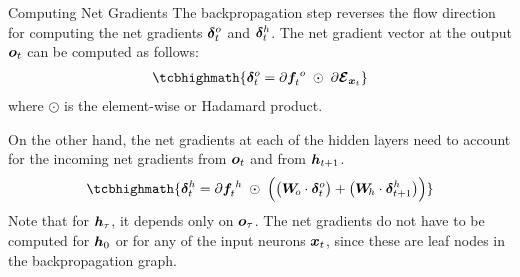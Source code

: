 %
%
\begin{frame}{Computing Net Gradients}
The backpropagation step reverses
the flow direction for computing the net gradients ${\bm \delta}^o_t$ and
${\bm \delta}^h_t$.%
%
The net gradient vector at the output ${\boldsymbol o}_t$ can be
computed as follows:
\begin{align*}
    \tcbhighmath{
\bdelta^o_t = \partial\bff^{\;o}_t \;\odot\; \partial\bcE_{\bx_t}}
\end{align*}
where $\odot$ is the element-wise or Hadamard product.

On the other hand, the net gradients at each of the hidden layers
need to account for the incoming net gradients from ${\boldsymbol o}_t$ and from
${\boldsymbol h}_{t+1}$.%
\begin{align*}
    \tcbhighmath{
    \bdelta^h_t = \partial\bff^{\;h}_t \;\odot\; 
    \Bigl( \bigl(\bW_{\!o} \cdot \bdelta^o_t \bigr) + 
        \bigl(\bW_{\!h} \cdot \bdelta^h_{t+1}  \bigr)
\Bigr)}
\end{align*}
Note that for ${\boldsymbol h}_\tau$, it depends only on ${\boldsymbol o}_\tau$.%
The net gradients do not have to be computed for ${\boldsymbol h}_0$ or for any
of the input neurons ${\boldsymbol x}_t$, since these are leaf nodes in the
backpropagation graph.%
\end{frame}
